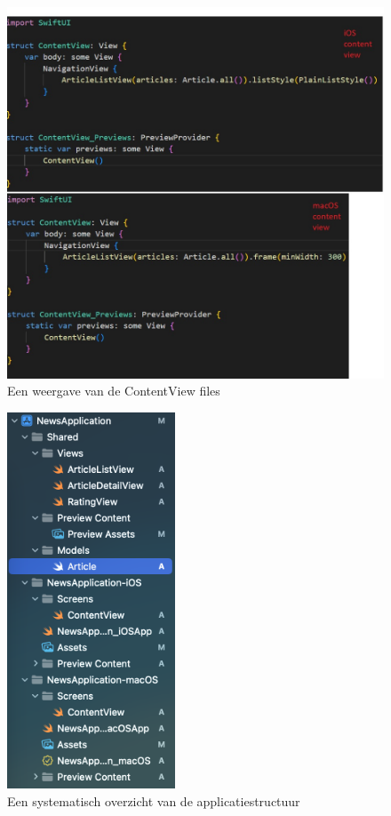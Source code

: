 \begin{figure}[h]
    \centering
    \includegraphics[width=\linewidth]{img/contentview.jpg}
    \caption{Een weergave van de ContentView files}
\end{figure}


\begin{figure}[h]
    \centering
    \includegraphics[width=50mm, scale=0.5]{img/applicatiestructuur.png}
    \caption{Een systematisch overzicht van de applicatiestructuur}
\end{figure}

